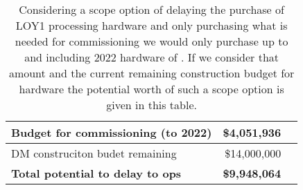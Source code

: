 \tiny \begin{longtable} { |p{}  |r  |r |} 
\caption{Considering a scope option of delaying the purchase of LOY1 processing hardware and only purchasing what is needed for commissioning we would only purchase up to and including 2022 hardware of . If we consider that amount and the current remaining construction budget for hardware the potential worth of such a scope option is given in this table. \label{tab:Scope}}\\ 
\hline 
\textbf{Budget for commissioning (to 2022)}&\textbf{\$4,051,936} \\ \hline
{DM construciton budet remaining}&{\$14,000,000} \\ \hline
\textbf{Total potential to delay to ops }&\textbf{\$9,948,064} \\ \hline
\end{longtable} \normalsize
